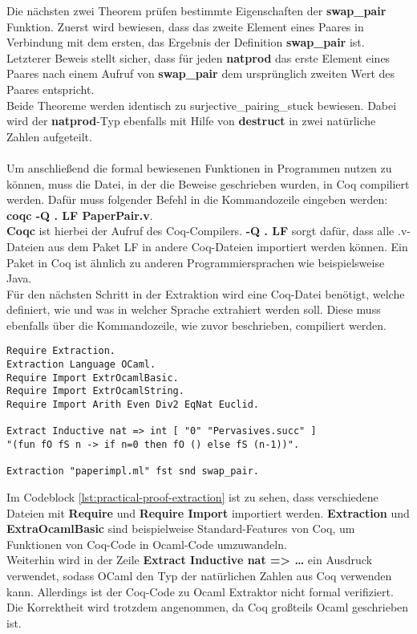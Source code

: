 Die nächsten zwei Theorem prüfen bestimmte Eigenschaften der \textbf{swap\_pair} Funktion. Zuerst wird bewiesen, dass das zweite Element eines Paares in Verbindung mit dem ersten, das Ergebnis der Definition \textbf{swap\_pair} ist. Letzterer Beweis stellt sicher, dass für jeden \textbf{natprod} das erste Element eines Paares nach einem Aufruf von \textbf{swap\_pair} dem ursprünglich zweiten Wert des Paares entspricht.\\
Beide Theoreme werden identisch zu surjective\_pairing\_stuck bewiesen. Dabei wird der \textbf{natprod}-Typ ebenfalls mit Hilfe von \textbf{destruct} in zwei natürliche Zahlen aufgeteilt.\\
\\
Um anschließend die formal bewiesenen Funktionen in Programmen nutzen zu können, muss die Datei, in der die Beweise geschrieben wurden, in Coq compiliert werden. Dafür muss folgender Befehl in die Kommandozeile eingeben werden:
\textbf{coqc -Q . LF PaperPair.v}. \\
\textbf{Coqc} ist hierbei der Aufruf des Coq-Compilers. \textbf{-Q . LF} sorgt dafür, dass alle .v-Dateien aus dem Paket LF in andere Coq-Dateien importiert werden können. Ein Paket in Coq ist ähnlich zu anderen Programmiersprachen wie beispielsweise Java.
\\
Für den nächsten Schritt in der Extraktion wird eine Coq-Datei benötigt, welche definiert, wie und was in welcher Sprache extrahiert werden soll. Diese muss ebenfalls über die Kommandozeile, wie zuvor beschrieben, compiliert werden.
\begin{lstlisting}[language=coq,firstnumber=1,caption=Coq Code extrahieren,label=lst:practical-proof-extraction]
Require Extraction.
Extraction Language OCaml.
Require Import ExtrOcamlBasic.
Require Import ExtrOcamlString.
Require Import Arith Even Div2 EqNat Euclid.

Extract Inductive nat => int [ "0" "Pervasives.succ" ]
"(fun fO fS n -> if n=0 then fO () else fS (n-1))".

Extraction "paperimpl.ml" fst snd swap_pair.
\end{lstlisting}
Im Codeblock \ref{lst:practical-proof-extraction} ist zu sehen, dass verschiedene Dateien mit \textbf{Require} und \textbf{Require Import} importiert werden. \textbf{Extraction} und \textbf{ExtraOcamlBasic} sind beispielweise Standard-Features von Coq, um Funktionen von Coq-Code in Ocaml-Code umzuwandeln.\\
Weiterhin wird in der Zeile \textbf{Extract Inductive nat => \dots} ein Ausdruck verwendet, sodass OCaml den Typ der natürlichen Zahlen aus Coq verwenden kann. Allerdings ist der Coq-Code zu Ocaml Extraktor nicht formal verifiziert. Die Korrektheit wird trotzdem angenommen, da Coq großteils Ocaml geschrieben ist.
